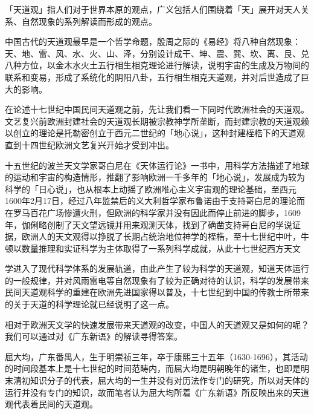 「天道观」指人们对于世界本原的观点，广义包括人们围绕着「天」展开对天人关系、自然现象的系列解读而形成的观点。

中国古代的天道观最早是一个哲学命题，殷周之际的《易经》将八种自然现象：天、地、雷、风、水、火、山、泽，分别设计成干、坤、震、巽、坎、离、艮、兑八种方位，以金木水火土五行相生相克理论进行解读，说明宇宙的生成及万物间的联系和变易，形成了系统化的阴阳八卦，五行相生相克天道观，并对后世造成了巨大的影响。

在论述十七世纪中国民间天道观之前，先让我们看一下同时代欧洲社会的天道观。文艺复兴前欧洲封建社会的天道观长期被宗教神学所垄断，而封建宗教的天道观赖以创立的理论是托勒密创立于西元二世纪的「地心说」，这种封建桎梏下的天道观直到十四世纪欧洲文艺复兴开始才受到冲出。

十五世纪的波兰天文学家哥白尼在《天体运行论》一书中，用科学方法描述了地球的运动和宇宙的构造情形，推翻了影响欧洲一千多年的「地心说」，发展成为较为科学的「日心说」，也从根本上动摇了欧洲唯心主义宇宙观的理论基础，至西元1600年2月17日，经过八年监禁后的义大利哲学家布鲁诺由于支持哥白尼的理论而在罗马百花广场惨遭火刑，但欧洲的科学家并没有因此而停止前进的脚步，1609年，伽俐略创制了天文望远镜并用来观测天体，找到了确凿支持哥白尼的学说证据，欧洲人的天文观得以挣脱了长期占统治地位神学的桎梏，至十七世纪中叶，牛顿以数量推理和实证科学为主体取得了一系列科学成就，从此十七世纪西方天文

\vfill
\begin{BookNotes}
\end{BookNotes}

\noindent 学进入了现代科学体系的发展轨道，由此产生了较为科学的天道观，知道天体运行的一般规律，并对风雨雷电等自然现象有了较为正确对待的认识，科学的发展带来民间天道观科学的重建在欧洲先进国家得以普及，十七世纪到中国的传教士所带来的关于天道的科学理论就已经说明了这一点。

相对于欧洲天文学的快速发展带来天道观的改变，中国人的天道观又是如何的呢？我们可以通过对《广东新语》的解读寻得答案。

屈大均，广东番禺人，生于明崇祯三年，卒于康熙三十五年（1630-1696），其活动的时间段基本上是十七世纪的时间范畴内，而屈大均是明朝晚年的诸生，也即是明末清初知识分子的代表，屈大均的一生并没有对历法作专门的研究，所以对天体的运行并没有专门的知识，故而笔者认为屈大均所着《广东新语》所反映出来的天道观代表着民间的天道观。

